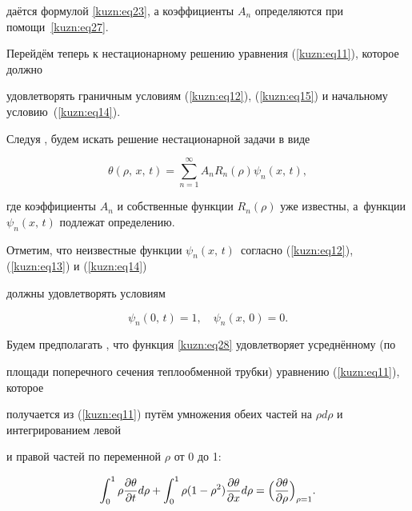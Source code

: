 даётся формулой \eqref{kuzn:eq23}, а коэффициенты $A_n$ определяются при помощи~\eqref{kuzn:eq27}.



Перейдём теперь к нестационарному решению уравнения (\ref{kuzn:eq11}), которое должно

удовлетворять граничным условиям (\ref{kuzn:eq12}), (\ref{kuzn:eq15}) и начальному условию~(\ref{kuzn:eq14}).



Следуя \cite{kuzn:bib4}, будем искать решение нестационарной задачи в виде

\begin{equation}

\label{kuzn:eq28}

\theta (\rho,\, x,\,t)=\sum\limits_{n=1}^\infty A_n R_n (\rho )\psi _n (x,\,t),

\end{equation}

где коэффициенты $A_n$ и собственные функции $R_n(\rho)$ уже известны, а~функции $\psi_n(x,\, t)$ подлежат определению.

Отметим, что неизвестные функции \linebreak $\psi_n(x,\, t)$~согласно (\ref{kuzn:eq12}), (\ref{kuzn:eq13}) и (\ref{kuzn:eq14})

должны удовлетворять условиям

\begin{equation}

\label{kuzn:eq29}

\psi_n(0,\, t) = 1,\quad  \psi_n(x,\, 0) = 0.

\end{equation}



Будем предполагать \cite{kuzn:bib4}, что функция \eqref{kuzn:eq28} удовлетворяет усреднённому (по

площади поперечного сечения теплообменной трубки) уравнению (\ref{kuzn:eq11}), которое

получается из (\ref{kuzn:eq11}) путём умножения обеих частей на $\rho d \rho $ и интегрированием левой

и правой частей по переменной $\rho$ от 0 до 1:


\[

\int_0^1 \rho \frac{\partial \theta }{\partial t}d\rho

+\int_0^1 \rho (1-\rho ^2)\frac{\partial \theta }{\partial x}d\rho =\Bigl( \frac{\partial \theta }{\partial \rho } \Bigr)_{\rho =1}.

\]


